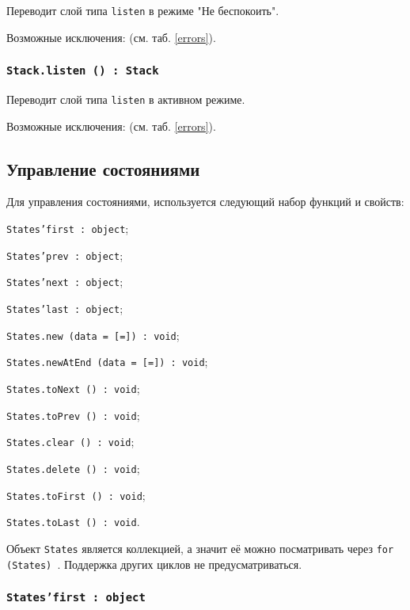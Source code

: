 Переводит слой типа \texttt{listen} в режиме "Не беспокоить".

Возможные исключения:  (см. таб. \ref{errors}).

\subsubsection{\texttt{Stack.listen () : Stack}}

Переводит слой типа \texttt{listen} в активном режиме.

Возможные исключения:  (см. таб. \ref{errors}).

\subsection{Управление состояниями}

Для управления состояниями, используется следующий набор функций и свойств:
\begin{icItems}
	\item \texttt{States'first : object};
	\item \texttt{States'prev : object};
	\item \texttt{States'next : object};
	\item \texttt{States'last : object};
	\item \texttt{States.new (data = [=]) : void};
	\item \texttt{States.newAtEnd (data = [=]) : void};
	\item \texttt{States.toNext () : void};
	\item \texttt{States.toPrev () : void};
	\item \texttt{States.clear () : void};
	\item \texttt{States.delete () : void};
	\item \texttt{States.toFirst () : void};
	\item \texttt{States.toLast () : void}.
\end{icItems}

Объект \texttt{States} является коллекцией, а значит её можно посматривать через \texttt{for (States) {}}. Поддержка других циклов не предусматриваться.

\subsubsection{\texttt{States'first : object}}

